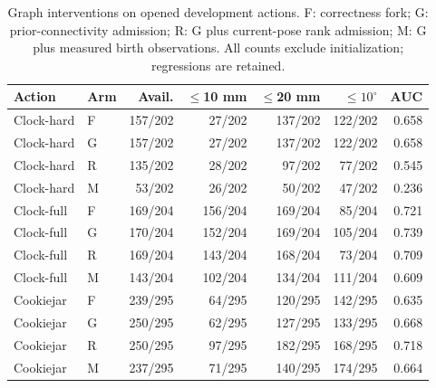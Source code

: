 \begin{table}[t]
\centering\scriptsize
\caption{Graph interventions on opened development actions. F: correctness fork; G: prior-connectivity admission; R: G plus current-pose rank admission; M: G plus measured birth observations. All counts exclude initialization; regressions are retained.}
\label{tab:anchor-admission}
\begin{tabular}{llrrrrr}\toprule
Action & Arm & Avail. & $\leq$10 mm & $\leq$20 mm & $\leq10^\circ$ & AUC\\\midrule
Clock-hard & F & 157/202 & 27/202 & 137/202 & 122/202 & 0.658\\
Clock-hard & G & 157/202 & 27/202 & 137/202 & 122/202 & 0.658\\
Clock-hard & R & 135/202 & 28/202 & 97/202 & 77/202 & 0.545\\
Clock-hard & M & 53/202 & 26/202 & 50/202 & 47/202 & 0.236\\
Clock-full & F & 169/204 & 156/204 & 169/204 & 85/204 & 0.721\\
Clock-full & G & 170/204 & 152/204 & 169/204 & 105/204 & 0.739\\
Clock-full & R & 169/204 & 143/204 & 168/204 & 73/204 & 0.709\\
Clock-full & M & 143/204 & 102/204 & 134/204 & 111/204 & 0.609\\
Cookiejar & F & 239/295 & 64/295 & 120/295 & 142/295 & 0.635\\
Cookiejar & G & 250/295 & 62/295 & 127/295 & 133/295 & 0.668\\
Cookiejar & R & 250/295 & 97/295 & 182/295 & 168/295 & 0.718\\
Cookiejar & M & 237/295 & 71/295 & 140/295 & 174/295 & 0.664\\
\bottomrule\end{tabular}\end{table}
